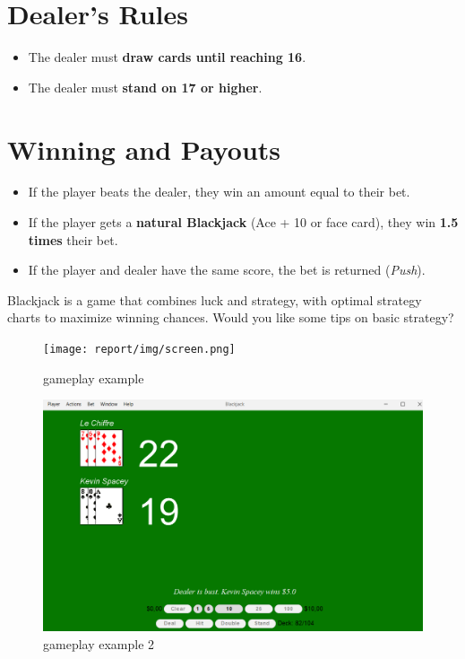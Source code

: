 \section{Dealer's Rules}

\begin{itemize}
    \item The dealer must \textbf{draw cards until reaching 16}.
    \item The dealer must \textbf{stand on 17 or higher}.
\end{itemize}

\section{Winning and Payouts}

\begin{itemize}
    \item If the player beats the dealer, they win an amount equal to their bet.
    \item If the player gets a \textbf{natural Blackjack} (Ace + 10 or face card), they win \textbf{1.5 times} their bet.
    \item If the player and dealer have the same score, the bet is returned (\textit{Push}).
\end{itemize}

Blackjack is a game that combines luck and strategy, with optimal strategy charts to maximize winning chances. Would you like some tips on basic strategy?


\begin{figure}[!htb]
    \centering
    \texttt{[image: report/img/screen.png]}
    \caption{gameplay example}
    \label{fig:scren1}
\end{figure}


\begin{figure}[!htb]
    \centering
    \includegraphics[scale=0.55]{report/img/screen2.png}
    \caption{gameplay example 2}
    \label{fig:scren2}
\end{figure}

